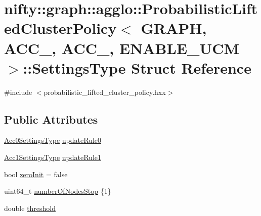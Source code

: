 \hypertarget{structnifty_1_1graph_1_1agglo_1_1ProbabilisticLiftedClusterPolicy_1_1SettingsType}{}\section{nifty\+:\+:graph\+:\+:agglo\+:\+:Probabilistic\+Lifted\+Cluster\+Policy$<$ G\+R\+A\+PH, A\+C\+C\+\_, A\+C\+C\+\_, E\+N\+A\+B\+L\+E\+\_\+\+U\+CM $>$\+:\+:Settings\+Type Struct Reference}
\label{structnifty_1_1graph_1_1agglo_1_1ProbabilisticLiftedClusterPolicy_1_1SettingsType}


{\ttfamily \#include $<$probabilistic\+\_\+lifted\+\_\+cluster\+\_\+policy.\+hxx$>$}

\subsection*{Public Attributes}
\begin{DoxyCompactItemize}
\item 
\hyperlink{classnifty_1_1graph_1_1agglo_1_1ProbabilisticLiftedClusterPolicy_a09fe3ffd1a828f90b14da010c525fce5}{Acc0\+Settings\+Type} \hyperlink{structnifty_1_1graph_1_1agglo_1_1ProbabilisticLiftedClusterPolicy_1_1SettingsType_a1d02c6543acabecf78b639258fab3055}{update\+Rule0}
\item 
\hyperlink{classnifty_1_1graph_1_1agglo_1_1ProbabilisticLiftedClusterPolicy_a4ecb3159c4d99c52bd145ce470d07cb8}{Acc1\+Settings\+Type} \hyperlink{structnifty_1_1graph_1_1agglo_1_1ProbabilisticLiftedClusterPolicy_1_1SettingsType_ab3247166ea15fde8e469a71e9d2d3c0a}{update\+Rule1}
\item 
bool \hyperlink{structnifty_1_1graph_1_1agglo_1_1ProbabilisticLiftedClusterPolicy_1_1SettingsType_af97a6730de6b6914aa69202c046656ae}{zero\+Init} = false
\item 
uint64\+\_\+t \hyperlink{structnifty_1_1graph_1_1agglo_1_1ProbabilisticLiftedClusterPolicy_1_1SettingsType_ab04d8db6c8b50f5ee673d219bbe610cc}{number\+Of\+Nodes\+Stop} \{1\}
\item 
double \hyperlink{structnifty_1_1graph_1_1agglo_1_1ProbabilisticLiftedClusterPolicy_1_1SettingsType_a597d21980e1cd423d8409b5eaae948b8}{threshold}
\end{DoxyCompactItemize}


